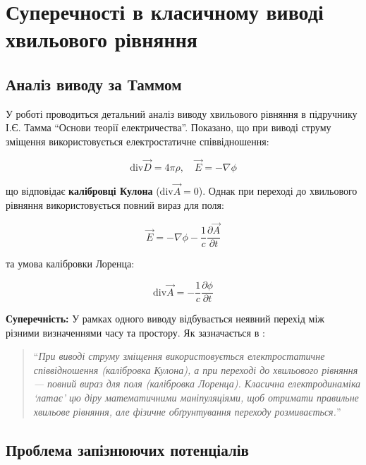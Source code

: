 \documentclass[12pt, a4paper]{article}
\begin{document}
\section{Суперечності в класичному виводі хвильового рівняння}

\subsection{Аналіз виводу за Таммом}

У роботі \cite{JugglingCalibrations} проводиться детальний аналіз виводу хвильового рівняння в підручнику І.Є. Тамма ``Основи теорії електричества''. Показано, що при виводі струму зміщення використовується електростатичне співвідношення:

\begin{equation}
\text{div} \vec{D} = 4\pi\rho, \quad \vec{E} = -\nabla \phi
\label{eq:coulomb_gauge}
\end{equation}

що відповідає \textbf{калібровці Кулона} ($\text{div} \vec{A} = 0$). Однак при переході до хвильового рівняння використовується повний вираз для поля:

\begin{equation}
\vec{E} = -\nabla \phi - \frac{1}{c}\frac{\partial \vec{A}}{\partial t}
\label{eq:full_field}
\end{equation}

та умова калібровки Лоренца:

\begin{equation}
\text{div} \vec{A} = -\frac{1}{c}\frac{\partial \phi}{\partial t}
\label{eq:lorentz_gauge}
\end{equation}

\textbf{Суперечність:} У рамках одного виводу відбувається неявний перехід між різними визначеннями часу та простору. Як зазначається в \cite{JugglingCalibrations}:

\begin{quote}
``\textit{При виводі струму зміщення використовується електростатичне співвідношення (калібровка Кулона), а при переході до хвильового рівняння --- повний вираз для поля (калібровка Лоренца). Класична електродинаміка `латає' цю діру математичними маніпуляціями, щоб отримати правильне хвильове рівняння, але фізичне обґрунтування переходу розмивається.}''
\end{quote}

\subsection{Проблема запізнюючих потенціалів}
\end{document}
